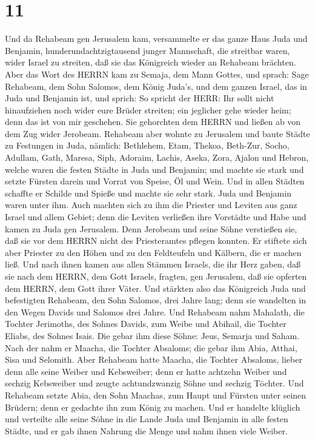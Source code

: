 \hypertarget{section-10}{%
\section{11}\label{section-10}}

 Und da Rehabeam gen Jerusalem kam, versammelte er das ganze
Haus Juda und Benjamin, hunderundachtzigtausend junger Mannschaft, die
streitbar waren, wider Israel zu streiten, daß sie das Königreich wieder
an Rehabeam brächten.  Aber das Wort des HERRN kam zu
Semaja, dem Mann Gottes, und sprach:  Sage Rehabeam, dem
Sohn Salomos, dem König Juda's, und dem ganzen Israel, das in Juda und
Benjamin ist, und sprich:  So spricht der HERR: Ihr sollt
nicht hinaufziehen noch wider eure Brüder streiten; ein jeglicher gehe
wieder heim; denn das ist von mir geschehen. Sie gehorchten dem HERRN
und ließen ab von dem Zug wider Jerobeam.  Rehabeam aber
wohnte zu Jerusalem und baute Städte zu Festungen in Juda, 
nämlich: Bethlehem, Etam, Thekoa,  Beth-Zur, Socho, Adullam,
 Gath, Maresa, Siph,  Adoraim, Lachis, Aseka,
 Zora, Ajalon und Hebron, welche waren die festen Städte in
Juda und Benjamin;  und machte sie stark und setzte Fürsten
darein und Vorrat von Speise, Öl und Wein.  Und in allen
Städten schaffte er Schilde und Spieße und machte sie sehr stark. Juda
und Benjamin waren unter ihm.  Auch machten sich zu ihm die
Priester und Leviten aus ganz Israel und allem Gebiet; 
denn die Leviten verließen ihre Vorstädte und Habe und kamen zu Juda gen
Jerusalem. Denn Jerobeam und seine Söhne verstießen sie, daß sie vor dem
HERRN nicht des Priesteramtes pflegen konnten.  Er stiftete
sich aber Priester zu den Höhen und zu den Feldteufeln und Kälbern, die
er machen ließ.  Und nach ihnen kamen aus allen Stämmen
Israels, die ihr Herz gaben, daß sie nach dem HERRN, dem Gott Israels,
fragten, gen Jerusalem, daß sie opferten dem HERRN, dem Gott ihrer
Väter.  Und stärkten also das Königreich Juda und
befestigten Rehabeam, den Sohn Salomos, drei Jahre lang; denn sie
wandelten in den Wegen Davids und Salomos drei Jahre.  Und
Rehabeam nahm Mahalath, die Tochter Jerimoths, des Sohnes Davids, zum
Weibe und Abihail, die Tochter Eliabs, des Sohnes Isais. 
Die gebar ihm diese Söhne: Jeus, Semarja und Saham.  Nach
der nahm er Maacha, die Tochter Absaloms; die gebar ihm Abia, Atthai,
Sisa und Selomith.  Aber Rehabeam hatte Maacha, die Tochter
Absaloms, lieber denn alle seine Weiber und Kebsweiber; denn er hatte
achtzehn Weiber und sechzig Kebsweiber und zeugte achtundzwanzig Söhne
und sechzig Töchter.  Und Rehabeam setzte Abia, den Sohn
Maachas, zum Haupt und Fürsten unter seinen Brüdern; denn er gedachte
ihn zum König zu machen.  Und er handelte klüglich und
verteilte alle seine Söhne in die Lande Juda und Benjamin in alle festen
Städte, und er gab ihnen Nahrung die Menge und nahm ihnen viele Weiber.

